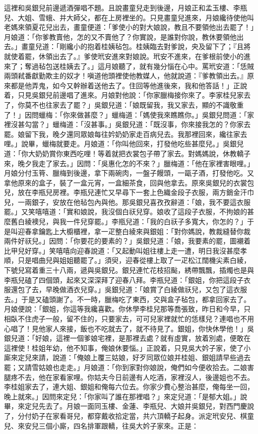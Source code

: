 \begin{showcontents}{}
這裡和吳銀兒前邊遞酒彈唱不題。且說畫童兒走到後邊，月娘正和孟玉樓、李瓶兒、大姐、雪蛾、并大師父，都在上房裡坐的。只見畫童兒進來，月娘纔待使他叫老媽來領夏花兒出去，畫童便道：「爹使小的對大娘說，教且不要領他出去罷了！」月娘道：「你爹教賣他，怎的又不賣他了？你實說，是誰對你說，教休要領他出去。」畫童兒道：「剛纔小的抱着桂姨毡包。桂姨臨去對爹說，央及留下了；『且將就使着罷，休領出去了。』爹使玳安進來對娘說。玳安不進來，在爹根前使小的進來了；奪過毡包送桂姨去了。」這月娘聽了，就有幾分惱在心中。罵玳安道：「恁賊兩頭弒番獻勤欺主的奴才！嗔道他頭裡使他教媒人，他就說道：『爹教領出去。』原來都是他弄鬼，如今又幹辦着送他去了。住回等他進後來，我和他答話！」正說着，只見吳銀兒前邊唱了進來。月娘對他說：「你家臘梅接你來了。李家桂兒家去了，你莫不也往家去了罷？」吳銀兒道：「娘既留我，我又家去，顯的不識敬重了！」因問蠟梅：「你來做甚麼？」蠟梅道：「媽使我來瞧瞧你。」吳銀兒問道：「家裡沒甚勾當？」蠟梅道：「沒甚事。」吳銀兒道：「既沒事，你來接我怎的？你家去罷。娘留下我，晚夕還同眾娘每往妗奶奶家走百病兒去。我那裡回來，纔往家去哩。」說畢，蠟梅就要走。月娘道：「你叫他回來，打發他吃些甚麼兒。」吳銀兒道：「你大奶奶賞你東西吃哩！等着就把衣裳包子帶了家去。對媽媽說，休教轎子來，晚夕我走了家去。」因問：「吳惠化怎的不來？」臘梅道：「他在家裡害眼哩。」月娘分付玉筲、臘梅到後邊，拿下兩碗肉，一盤子饅頭，一甌子酒，打發他吃。又拿他原來的盒子，裝了一盒元宵，一盒細茶食，回與他拿去。原來吳銀兒的衣裳包兒，放在李瓶兒房裡。李瓶兒連忙又早尋下一套上色織金段子衣服，兩方銷金汗巾兒，一兩銀子，安放在他毡包內與他。那吳銀兒喜孜孜辭道：「娘，我不要這衣服罷。」又笑嘻嘻道：「實和娘說，我沒個白祆兒穿。娘收了這段子衣服，不拘娘的甚麼舊白綾襖兒，與我一件兒穿罷。」李瓶兒道：「我的白祆子多寬大，你怎的？」于是叫迎春拿鑰匙上大櫥櫃裡，拿一疋整白綾來與銀姐：「對你媽說，教裁縫替你裁兩件好祆兒。」因問：「你要花的要素的？」吳銀兒道：「娘，我要素的罷，圖襯着比甲兒好穿。」笑嘻嘻向迎春說道：「又起動叫姐往樓上走一遭，明日我沒甚麼孝順，只是唱曲兒與姐姐聽罷了。」須臾，迎春從樓上取了一疋松江闊機尖素白綾，下號兒寫着重三十八兩，遞與吳銀兒。銀兒連忙花枝招颭，綉帶飄飄，插燭也是與李瓶兒磕了四個頭，起來又深深拜了迎春八拜。李瓶兒道：「銀姐，你把這段子衣服還包了去，早晚做酒衣兒穿。」吳銀兒道：「娘賞了白綾做祆兒，又包了這衣服去。」于是又磕頭謝了。不一時，臘梅吃了東西，交與盒子毡包，都拿回家去了。月娘便說：「銀姐，你這等我纔喜歡。你休學李桂兒那等喬張致，昨日和今早，只相臥不住虎子一般，留不住的，只要家去，可可兒家裡就忙的恁樣兒？連唱也不用心唱了！見他家人來接，飯也不吃就去了，就不待見了。銀姐，你快休學他！」吳銀兒道：「好娘，這裡一個爹娘宅裡，是那裡去處？就有虛實，放着別處，便敢在這裡使！桂姐年幼，他不知事，俺娘休要惱。」正說着，只見吳大妗子家，使了小廝來定兒來請，說道：「俺娘上覆三姑娘，好歹同眾位娘并桂姐、銀姐請早些過去罷；又請雪姑娘也走走。」月娘道：「你到家對你娘說，俺們如今便收拾去。二娘害腿疼不去，他在家看家哩。你姑夫今日前邊有人吃酒，家裡沒人，後邊姐也不去。李桂姐家去了，連大姐、銀姐和俺每六位去。你家少費心整治甚麼，俺每坐一回，晚上就來。」因問來定兒：「你家叫了誰在那裡唱？」來定兒道：「是郁大姐。」說畢，來定兒先去了。月娘一面同玉樓、金蓮、李瓶兒、大娘并吳銀兒，對西門慶說了，分付奶子在家看哥兒，都穿戴收拾定當，共六頂轎子起身。派定玳安兒、棋童兒、來安兒三個小廝，四名排軍跟轎，往吳大妗子家來。正是：


\end{showcontents}
